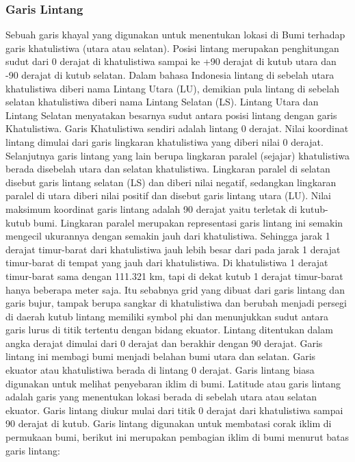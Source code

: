\subsubsection{Garis Lintang}
Sebuah garis khayal yang digunakan untuk menentukan lokasi di Bumi terhadap garis khatulistiwa (utara atau selatan). Posisi lintang merupakan penghitungan sudut dari 0 derajat di khatulistiwa sampai ke +90 derajat di kutub utara dan -90 derajat di kutub selatan. Dalam bahasa Indonesia lintang di sebelah utara khatulistiwa diberi nama Lintang Utara (LU), demikian pula lintang di sebelah selatan khatulistiwa diberi nama Lintang Selatan (LS). Lintang Utara dan Lintang Selatan menyatakan besarnya sudut antara posisi lintang dengan garis Khatulistiwa. Garis Khatulistiwa sendiri adalah lintang 0 derajat. 
Nilai koordinat lintang dimulai dari garis lingkaran khatulistiwa yang diberi nilai 0 derajat. Selanjutnya garis lintang yang lain berupa lingkaran paralel (sejajar) khatulistiwa berada disebelah utara dan selatan khatulistiwa. Lingkaran paralel di selatan disebut garis lintang selatan (LS) dan diberi nilai negatif, sedangkan lingkaran paralel di utara diberi nilai positif dan disebut garis lintang utara (LU). Nilai maksimum koordinat garis lintang adalah 90 derajat yaitu terletak di kutub-kutub bumi. 
Lingkaran paralel merupakan representasi garis lintang ini semakin mengecil ukurannya dengan semakin jauh dari khatulistiwa. Sehingga jarak 1 derajat timur-barat dari khatulistiwa jauh lebih besar dari pada jarak 1 derajat timur-barat di tempat yang jauh dari khatulistiwa. Di khatulistiwa 1 derajat timur-barat sama dengan 111.321 km, tapi di dekat kutub 1 derajat timur-barat hanya beberapa meter saja. Itu sebabnya grid yang dibuat dari garis lintang dan garis bujur, tampak berupa sangkar di khatulistiwa dan berubah menjadi persegi di daerah kutub
lintang memiliki symbol phi dan menunjukkan sudut antara garis lurus di titik tertentu dengan bidang ekuator. Lintang ditentukan dalam angka derajat dimulai dari 0 derajat dan berakhir dengan 90 derajat. Garis lintang ini membagi bumi menjadi belahan bumi utara dan selatan. Garis ekuator atau khatulistiwa berada di lintang 0 derajat. Garis lintang biasa digunakan untuk melihat penyebaran iklim di bumi.
Latitude atau garis lintang adalah garis yang menentukan lokasi berada di sebelah utara atau selatan ekuator. Garis lintang diukur mulai dari titik 0 derajat dari khatulistiwa sampai 90 derajat di kutub. Garis lintang digunakan untuk membatasi corak iklim di permukaan bumi, berikut ini merupakan pembagian iklim di bumi menurut batas garis lintang:
